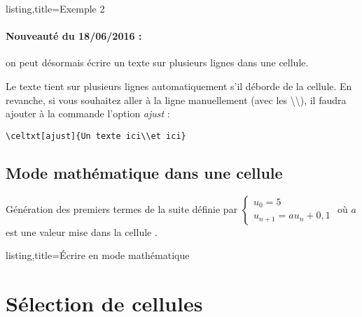 \documentclass[a4paper,french]{article}
\begin{document}
\medskip

\begin{tcblisting}{listing,title=Exemple 2}
\end{tcblisting}

\paragraph*{Nouveaut\'e du 18/06/2016 :} on peut d\'esormais \'ecrire un texte sur plusieurs lignes dans une cellule.

Le texte tient sur plusieurs lignes automatiquement s'il d\'eborde de la cellule. En revanche, si vous souhaitez aller \`a la ligne manuellement (avec les \textbackslash\textbackslash), il faudra ajouter \`a la commande l'option \emph{ajust} :
\begin{center}
\texttt{\textbackslash celtxt[ajust]\{Un texte ici\textbackslash\textbackslash et ici\}}
\end{center}

\subsection{Mode math\'ematique dans une cellule}

G\'en\'eration des premiers termes de la suite d\'efinie par $\left\{\begin{array}{l}
u_0=5\\
u_{n+1}=au_n+0,1
\end{array}
\right.$ o\`u $a$ est une valeur mise dans la cellule {}.

\begin{tcblisting}{listing,title=\'Ecrire en mode math\'ematique}
\end{tcblisting}

\section{S\'election de cellules}
\end{document}
